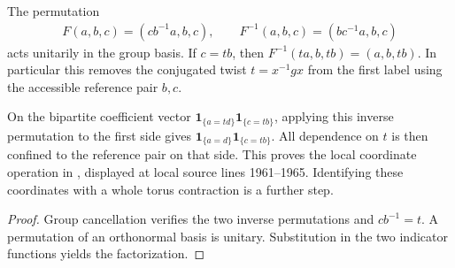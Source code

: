 \begin{lemma}%
    \label{thm:peps_regular_boundary_untwisting}
    \leanok
    The permutation
    \begin{align}
        F(a,b,c)=(cb^{-1}a,b,c),\qquad
        F^{-1}(a,b,c)=(bc^{-1}a,b,c)
    \end{align}
    acts unitarily in the group basis. If $c=tb$, then
    $F^{-1}(ta,b,tb)=(a,b,tb)$. In particular this removes the
    conjugated twist $t=x^{-1}gx$ from the first label using the
    accessible reference pair $b,c$.

    On the bipartite coefficient vector
    $\mathbf 1_{\{a=td\}}\mathbf 1_{\{c=tb\}}$, applying this inverse
    permutation to the first side gives
    $\mathbf 1_{\{a=d\}}\mathbf 1_{\{c=tb\}}$. All dependence on $t$
    is then confined to the reference pair on that side. This proves
    the local coordinate operation in
    \cite{Schuch2010PEPS}, displayed at local source lines 1961--1965.
    Identifying these coordinates with a whole torus contraction is
    a further step.
\end{lemma}
\begin{proof}\leanok
    Group cancellation verifies the two inverse permutations and
    $cb^{-1}=t$. A permutation of an orthonormal basis is unitary.
    Substitution in the two indicator functions yields the factorization.
\end{proof}
